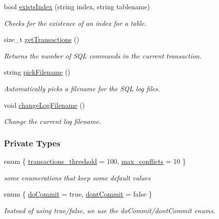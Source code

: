 \begin{CompactItemize}
bool \hyperlink{classSQLiteConnection_SQLiteConnectiona13}{exists\-Index} (string index, string tablename)
\begin{CompactList}\small\item\em Checks for the existence of an index for a table.\item\end{CompactList}\item 
size\_\-t \hyperlink{classSQLiteConnection_SQLiteConnectiona14}{get\-Transactions} ()
\begin{CompactList}\small\item\em Returns the number of SQL commands in the current transaction.\item\end{CompactList}\item 
string \hyperlink{classSQLiteConnection_SQLiteConnectiona15}{pick\-Filename} ()
\begin{CompactList}\small\item\em Automatically picks a filename for the SQL log files.\item\end{CompactList}\item 
void \hyperlink{classSQLiteConnection_SQLiteConnectiona16}{change\-Log\-Filename} ()
\begin{CompactList}\small\item\em Change the current log filename.\item\end{CompactList}\end{CompactItemize}
\subsubsection*{Private Types}
\begin{CompactItemize}
\item 
enum \{ \hyperlink{classSQLiteConnection_SQLiteConnectionu4SQLiteConnectionu0}{transactions\_\-threshold} =  100, 
\hyperlink{classSQLiteConnection_SQLiteConnectionu4SQLiteConnectionu1}{max\_\-conflicts} =  10
 \}
\begin{CompactList}\small\item\em some enumerations that keep some default values\item\end{CompactList}\item 
enum \{ \hyperlink{classSQLiteConnection_SQLiteConnectionu5SQLiteConnectionu2}{do\-Commit} =  true, 
\hyperlink{classSQLiteConnection_SQLiteConnectionu5SQLiteConnectionu3}{dont\-Commit} =  false
 \}
\begin{CompactList}\small\item\em Instead of using true/false, we use the do\-Commit/dont\-Commit enums.\item\end{CompactList}\end{CompactItemize}
